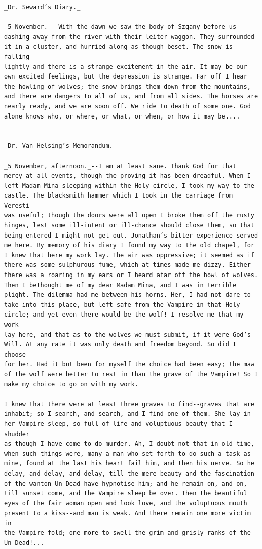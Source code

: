 \documentclass{article}
\begin{document}
\begin{verbatim}
_Dr. Seward’s Diary._

_5 November._--With the dawn we saw the body of Szgany before us
dashing away from the river with their leiter-waggon. They surrounded
it in a cluster, and hurried along as though beset. The snow is falling
lightly and there is a strange excitement in the air. It may be our
own excited feelings, but the depression is strange. Far off I hear
the howling of wolves; the snow brings them down from the mountains,
and there are dangers to all of us, and from all sides. The horses are
nearly ready, and we are soon off. We ride to death of some one. God
alone knows who, or where, or what, or when, or how it may be....


_Dr. Van Helsing’s Memorandum._

_5 November, afternoon._--I am at least sane. Thank God for that
mercy at all events, though the proving it has been dreadful. When I
left Madam Mina sleeping within the Holy circle, I took my way to the
castle. The blacksmith hammer which I took in the carriage from Veresti
was useful; though the doors were all open I broke them off the rusty
hinges, lest some ill-intent or ill-chance should close them, so that
being entered I might not get out. Jonathan’s bitter experience served
me here. By memory of his diary I found my way to the old chapel, for
I knew that here my work lay. The air was oppressive; it seemed as if
there was some sulphurous fume, which at times made me dizzy. Either
there was a roaring in my ears or I heard afar off the howl of wolves.
Then I bethought me of my dear Madam Mina, and I was in terrible
plight. The dilemma had me between his horns. Her, I had not dare to
take into this place, but left safe from the Vampire in that Holy
circle; and yet even there would be the wolf! I resolve me that my work
lay here, and that as to the wolves we must submit, if it were God’s
Will. At any rate it was only death and freedom beyond. So did I choose
for her. Had it but been for myself the choice had been easy; the maw
of the wolf were better to rest in than the grave of the Vampire! So I
make my choice to go on with my work.

I knew that there were at least three graves to find--graves that are
inhabit; so I search, and search, and I find one of them. She lay in
her Vampire sleep, so full of life and voluptuous beauty that I shudder
as though I have come to do murder. Ah, I doubt not that in old time,
when such things were, many a man who set forth to do such a task as
mine, found at the last his heart fail him, and then his nerve. So he
delay, and delay, and delay, till the mere beauty and the fascination
of the wanton Un-Dead have hypnotise him; and he remain on, and on,
till sunset come, and the Vampire sleep be over. Then the beautiful
eyes of the fair woman open and look love, and the voluptuous mouth
present to a kiss--and man is weak. And there remain one more victim in
the Vampire fold; one more to swell the grim and grisly ranks of the
Un-Dead!...


\end{verbatim}
\end{document}
